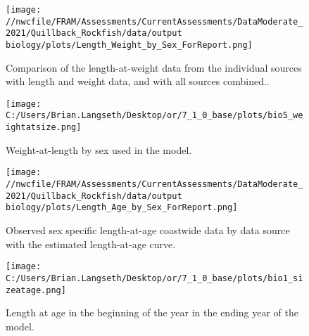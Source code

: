 \documentclass[11pt,
  english,
  a4paper,
]{article}
\begin{document}
\begin{figure}
\centering
\texttt{[image: //nwcfile/FRAM/Assessments/CurrentAssessments/DataModerate\_2021/Quillback\_Rockfish/data/output biology/plots/Length\_Weight\_by\_Sex\_ForReport.png]}
\caption{Comparison of the length-at-weight data from the individual sources with length and weight data, and with all sources combined..\label{fig:len-weight-survey}}
\end{figure}

\tagmcend\tagstructend


\begin{figure}
\centering
\texttt{[image: C:/Users/Brian.Langseth/Desktop/or/7\_1\_0\_base/plots/bio5\_weightatsize.png]}
\caption{Weight-at-length by sex used in the model.\label{fig:len-weight}}
\end{figure}

\tagmcend\tagstructend


\begin{figure}
\centering
\texttt{[image: //nwcfile/FRAM/Assessments/CurrentAssessments/DataModerate\_2021/Quillback\_Rockfish/data/output biology/plots/Length\_Age\_by\_Sex\_ForReport.png]}
\caption{Observed sex specific length-at-age coastwide data by data source with the estimated length-at-age curve.\label{fig:len-age-data}}
\end{figure}

\tagmcend\tagstructend


\begin{figure}
\centering
\texttt{[image: C:/Users/Brian.Langseth/Desktop/or/7\_1\_0\_base/plots/bio1\_sizeatage.png]}
\caption{Length at age in the beginning of the year in the ending year of the model.\label{fig:len-age-ss}}
\end{figure}

\tagmcend\tagstructend

\end{document}
